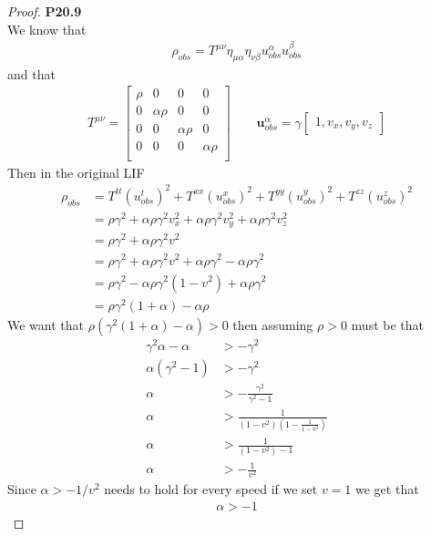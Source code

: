 \documentclass[11pt]{article}
\theoremstyle{definition}
\begin{document}
\begin{proof}{\textbf{P20.9}}\\
We know that 
\begin{align*}
    \rho_{obs} = T^{\mu\nu}\eta_{\mu\alpha}\eta_{\nu\beta} u^\alpha_{obs} u^\beta_{obs}
\end{align*}
and that
\begin{align*}
    T^{\mu\nu} = \begin{bmatrix}
        \rho & 0 & 0 & 0\\
        0 & \alpha\rho & 0 & 0\\
        0 & 0 & \alpha\rho & 0\\
        0 & 0 & 0 & \alpha\rho\\
    \end{bmatrix}
    \qquad
    \bm{u}_{obs}^\alpha = \gamma\begin{bmatrix}
        1, v_x, v_y, v_z
    \end{bmatrix}
\end{align*}
Then in the original LIF
\begin{align*}
    \rho_{obs}
    &= T^{tt} (u^t_{obs})^2
    + T^{xx} (u^x_{obs})^2
    + T^{yy} (u^y_{obs})^2
    + T^{zz} (u^z_{obs})^2\\
    &= \rho\gamma^2
    + \alpha\rho\gamma^2v_x^2
    + \alpha\rho\gamma^2v_y^2
    + \alpha\rho\gamma^2v_z^2\\
    &= \rho\gamma^2
    + \alpha\rho\gamma^2v^2\\
    &= \rho\gamma^2
    + \alpha\rho\gamma^2v^2 + \alpha\rho\gamma^2 - \alpha\rho\gamma^2\\
    &= \rho\gamma^2 - \alpha\rho\gamma^2(1-v^2) + \alpha\rho\gamma^2\\
    &= \rho\gamma^2(1 + \alpha) - \alpha\rho
\end{align*}
We want that $\rho(\gamma^2(1 + \alpha) - \alpha) > 0$ then assuming $\rho > 0$
must be that
\begin{align*}
    \gamma^2\alpha - \alpha &> - \gamma^2\\
    \alpha(\gamma^2 - 1) &> -\gamma^2\\
    \alpha &> -\frac{\gamma^2}{\gamma^2 - 1}\\
    \alpha &> \frac{1}{(1- v^2)(1 - \frac{1}{1-v^2})}\\
    \alpha &> \frac{1}{(1- v^2) - 1}\\
    \alpha &> -\frac{1}{v^2}
\end{align*}
Since $\alpha > -1/v^2$ needs to hold for every speed if we set $v = 1$ we get
that
\begin{align*}
    \alpha > -1
\end{align*}
\end{proof}
\end{document}
